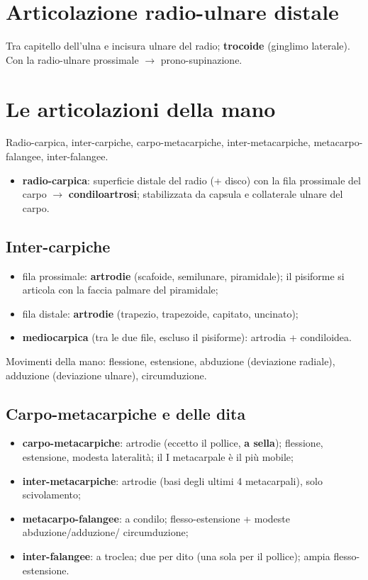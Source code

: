\section{Articolazione radio-ulnare distale}

Tra capitello dell'ulna e incisura ulnare del radio; \textbf{trocoide} (ginglimo laterale). Con la
radio-ulnare prossimale $\rightarrow$ prono-supinazione.

\section{Le articolazioni della mano}

Radio-carpica, inter-carpiche, carpo-metacarpiche, inter-metacarpiche, metacarpo-falangee,
inter-falangee.
\begin{itemize}
  \item \textbf{radio-carpica}: superficie distale del radio (+ disco) con la fila prossimale del
    carpo $\rightarrow$ \textbf{condiloartrosi}; stabilizzata da capsula e collaterale ulnare del
    carpo.
\end{itemize}

\subsection{Inter-carpiche}
\begin{itemize}
  \item fila prossimale: \textbf{artrodie} (scafoide, semilunare, piramidale); il pisiforme si
    articola con la faccia palmare del piramidale;
  \item fila distale: \textbf{artrodie} (trapezio, trapezoide, capitato, uncinato);
  \item \textbf{mediocarpica} (tra le due file, escluso il pisiforme): artrodia + condiloidea.
\end{itemize}
Movimenti della mano: flessione, estensione, abduzione (deviazione radiale), adduzione (deviazione
ulnare), circumduzione.

\subsection{Carpo-metacarpiche e delle dita}
\begin{itemize}
  \item \textbf{carpo-metacarpiche}: artrodie (eccetto il pollice, \textbf{a sella}); flessione,
    estensione, modesta lateralità; il I metacarpale è il più mobile;
  \item \textbf{inter-metacarpiche}: artrodie (basi degli ultimi 4 metacarpali), solo scivolamento;
  \item \textbf{metacarpo-falangee}: a condilo; flesso-estensione + modeste abduzione/adduzione/
    circumduzione;
  \item \textbf{inter-falangee}: a troclea; due per dito (una sola per il pollice); ampia
    flesso-estensione.
\end{itemize}
